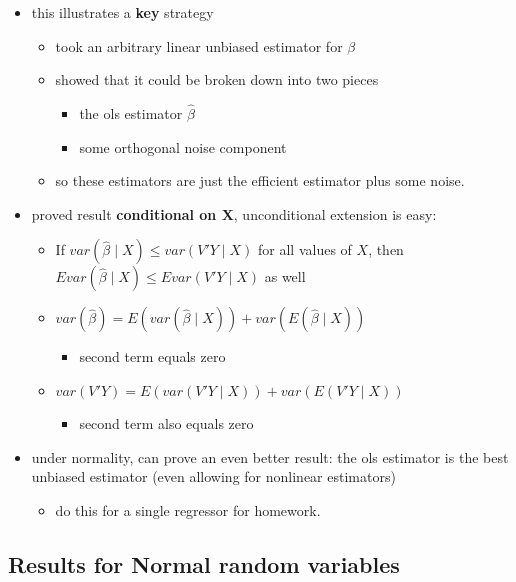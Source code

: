 \begin{itemize}
\item this illustrates a \textbf{key} strategy
\begin{itemize}
\item took an arbitrary linear unbiased estimator for $\beta$
\item showed that it could be broken down into two pieces
\begin{itemize}
\item the ols estimator $\hat\beta$
\item some orthogonal noise component
\end{itemize}
\item so these estimators are just the efficient estimator plus
            some noise.
\end{itemize}
\item proved result \textbf{conditional on X}, unconditional extension is easy:
\begin{itemize}
\item If $var(\hat\beta \mid X) \leq var(V'Y \mid X)$ for all
            values of $X$, then $E var(\hat\beta \mid X) \leq E var(V'Y
            \mid X)$ as well
\item $var(\hat\beta) = E(var(\hat\beta \mid X)) + var(E(\hat\beta
            \mid X))$
\begin{itemize}
\item second term equals zero
\end{itemize}
\item $var(V'Y) = E(var(V'Y \mid X)) + var(E(V'Y \mid X))$
\begin{itemize}
\item second term also equals zero
\end{itemize}
\end{itemize}
\item under normality, can prove an even better result: the ols
          estimator is the best unbiased estimator (even allowing for
          nonlinear estimators)
\begin{itemize}
\item do this for a single regressor for homework.
\end{itemize}
\end{itemize}
\subsection{Results for Normal random variables}
\label{sec-3-2}

